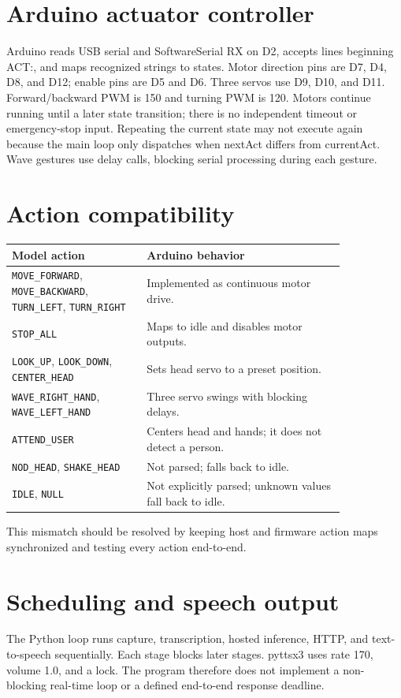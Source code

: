 \documentclass[12pt,a4paper]{report}
\begin{document}
\section{Arduino actuator controller}
Arduino reads USB serial and SoftwareSerial RX on D2, accepts lines beginning ACT:, and maps recognized strings to states. Motor direction pins are D7, D4, D8, and D12; enable pins are D5 and D6. Three servos use D9, D10, and D11. Forward/backward PWM is 150 and turning PWM is 120. Motors continue running until a later state transition; there is no independent timeout or emergency-stop input. Repeating the current state may not execute again because the main loop only dispatches when nextAct differs from currentAct. Wave gestures use delay calls, blocking serial processing during each gesture.
\section{Action compatibility}
\begin{longtable}{p{0.34\linewidth}p{0.5\linewidth}}\toprule Model action & Arduino behavior \\\midrule \texttt{MOVE\_FORWARD}, \texttt{MOVE\_BACKWARD}, \texttt{TURN\_LEFT}, \texttt{TURN\_RIGHT} & Implemented as continuous motor drive. \\ \texttt{STOP\_ALL} & Maps to idle and disables motor outputs. \\ \texttt{LOOK\_UP}, \texttt{LOOK\_DOWN}, \texttt{CENTER\_HEAD} & Sets head servo to a preset position. \\ \texttt{WAVE\_RIGHT\_HAND}, \texttt{WAVE\_LEFT\_HAND} & Three servo swings with blocking delays. \\ \texttt{ATTEND\_USER} & Centers head and hands; it does not detect a person. \\ \texttt{NOD\_HEAD}, \texttt{SHAKE\_HEAD} & Not parsed; falls back to idle. \\ \texttt{IDLE}, \texttt{NULL} & Not explicitly parsed; unknown values fall back to idle. \\\bottomrule\end{longtable}
This mismatch should be resolved by keeping host and firmware action maps synchronized and testing every action end-to-end.
\section{Scheduling and speech output}
The Python loop runs capture, transcription, hosted inference, HTTP, and text-to-speech sequentially. Each stage blocks later stages. pyttsx3 uses rate 170, volume 1.0, and a lock. The program therefore does not implement a non-blocking real-time loop or a defined end-to-end response deadline.
\end{document}
